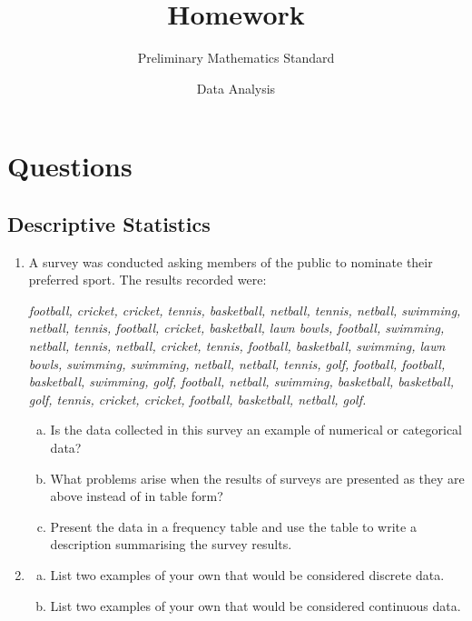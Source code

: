 \documentclass{article}
\begin{document}
\title{Homework}
\date{Data Analysis}
\author{Preliminary Mathematics Standard}
\maketitle


\section{Questions}
\subsection{Descriptive Statistics}
\begin{enumerate}
 \item A survey was conducted asking members of the public to nominate their preferred sport. The results recorded were:
\begin{center}
\textit{football, cricket, cricket, tennis, basketball, netball, tennis, netball, swimming, netball, tennis, football, cricket, basketball, lawn bowls, football, swimming, netball, tennis, netball, cricket, tennis, football, basketball, swimming, lawn bowls, swimming, swimming, netball, netball, tennis, golf, football, football, basketball, swimming, golf, football, netball, swimming, basketball, basketball, golf, tennis, cricket, cricket, football, basketball, netball, golf.}
\end{center}
 
\begin{enumerate}[(a)]
  \item Is the data collected in this survey an example of numerical or categorical data?
  \item What problems arise when the results of surveys are presented as they are above instead of in table form?
  \item Present the data in a frequency table and use the table to write a description summarising the survey results.
\end{enumerate}

\item \begin{enumerate}[(a)] 
\item List two examples of your own that would be considered discrete data.
\item List two examples of your own that would be considered continuous data.
 \end{enumerate}


\end{enumerate}
\end{document}
